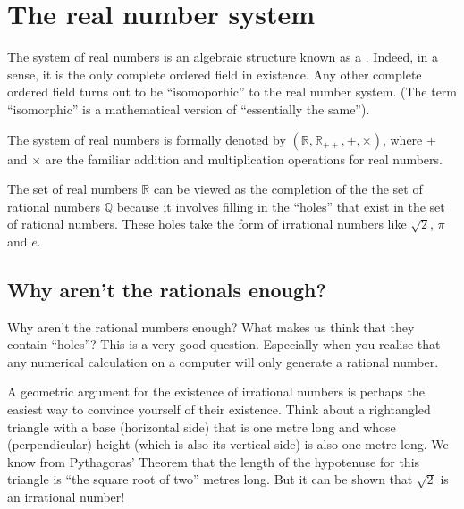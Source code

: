 \documentclass[letterpaper,10pt,english]{jupyterBook}
\begin{document}
\section{The real number system}
\label{\detokenize{02.sets_numbers_coordinates_distances:the-real-number-system}}
\sphinxAtStartPar
The system of real numbers is an algebraic structure known as a . Indeed, in a sense, it is the only complete ordered field in existence. Any other complete ordered field turns out to be “isomoporhic” to the real number system. (The term “isomorphic” is a mathematical version of “essentially the same”).

\sphinxAtStartPar
The system of real numbers is formally denoted by \((\mathbb{R}, \mathbb{R}_{++}, +, \times)\), where \(+\) and \(\times\) are the familiar addition and multiplication operations for real numbers.

\sphinxAtStartPar
The set of real numbers \(\mathbb{R}\) can be viewed as the completion of the the set of rational numbers \(\mathbb{Q}\) because it involves filling in the “holes” that exist in the set of rational numbers. These holes take the form of irrational numbers like \(\sqrt{2}\), \(\pi\) and \(e\).


\subsection{Why aren’t the rationals enough?}
\label{\detokenize{02.sets_numbers_coordinates_distances:why-aren-t-the-rationals-enough}}
\sphinxAtStartPar
Why aren’t the rational numbers enough? What makes us think that they contain “holes”? This is a very good question. Especially when you realise that any numerical calculation on a computer will only generate a rational number.

\sphinxAtStartPar
A geometric argument for the existence of irrational numbers is perhaps the easiest way to convince yourself of their existence. Think about a right\sphinxhyphen{}angled triangle with a base (horizontal side) that is one metre long and whose (perpendicular) height (which is also its vertical side) is also one metre long. We know from Pythagoras’ Theorem that the length of the hypotenuse for this triangle is “the
square root of two” metres long. But it can be shown that \(\sqrt{2}\) is an irrational number!
\end{document}
